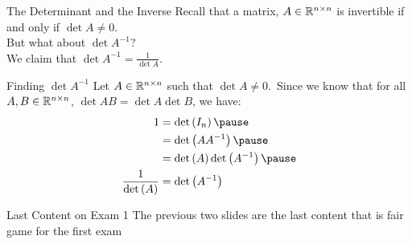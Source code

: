 \documentclass[xcoler=dvipsnames, aspectratio=169]{beamer}
\date{More Determinant Properties}
\begin{document}
    \begin{frame}{The Determinant and the Inverse}
        Recall that a matrix, $A\in\mathbb{R}^{n\times n}$ is invertible if and only 
        if $\det{A} \neq 0$.\pause\\

        But what about $\det{A^{-1}}$?\pause\\

        We claim that $\det{A^{-1}} = \frac{1}{\det{A}}$.
    \end{frame}
    \begin{frame}{Finding $\det{A^{-1}}$}
        Let $A\in\mathbb{R}^{n\times n}$ such that $\det{A}\neq 0$.\pause\ Since we know that 
        for all $A,B\in\mathbb{R}^{n\times n}$, $\det{AB}=\det{A}\det{B}$, we have:\pause
        \begin{align*}
            1   &= \det{I_n}\pause \\
                &= \det{AA^{-1}}\pause\\
                &= \det{A}\det{A^{-1}}\pause\\
            \frac{1}{\det{A}} &= \det{A^{-1}}
        \end{align*}
    \end{frame}
    \begin{frame}{Last Content on Exam 1}
        The previous two slides are the last content that is fair game for the first exam
    \end{frame}
\end{document}
